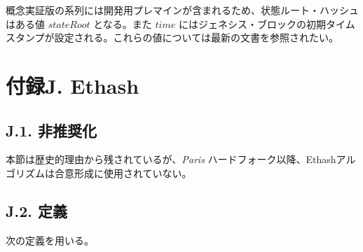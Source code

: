 \documentclass[
]{ltjsarticle}
\begin{document}
概念実証版の系列には開発用プレマインが含まれるため、状態ルート・ハッシュはある値
\(stateRoot\) となる。また \(time\)
にはジェネシス・ブロックの初期タイムスタンプが設定される。これらの値については最新の文書を参照されたい。

\protect\hypertarget{app:ethash}{}{}

\hypertarget{ux4ed8ux9332j.-ethash}{%
\section{付録J. Ethash}\label{ux4ed8ux9332j.-ethash}}

\hypertarget{j.1.-ux975eux63a8ux5968ux5316}{%
\subsection{J.1. 非推奨化}\label{j.1.-ux975eux63a8ux5968ux5316}}

本節は歴史的理由から残されているが、\emph{Paris}
ハードフォーク以降、Ethashアルゴリズムは合意形成に使用されていない。

\hypertarget{j.2.-ux5b9aux7fa9}{%
\subsection{J.2. 定義}\label{j.2.-ux5b9aux7fa9}}

次の定義を用いる。
\end{document}

